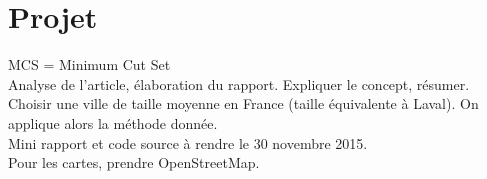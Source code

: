 \section{Projet}
MCS = Minimum Cut Set\\
Analyse de l'article, élaboration du rapport. Expliquer le concept, résumer. \\
Choisir une ville de taille moyenne en France (taille équivalente à Laval). On applique alors la méthode donnée.\\
Mini rapport et code source à rendre le 30 novembre 2015.\\
Pour les cartes, prendre OpenStreetMap.